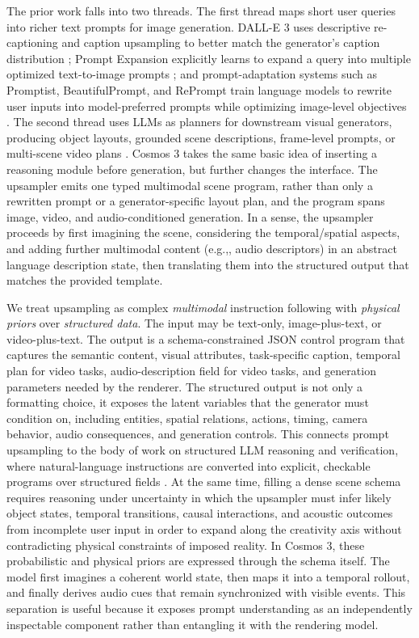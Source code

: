 \documentclass{llmxive}
\providecommand{\eg}{e.g.,\xspace}
\begin{document}
The prior work falls into two threads. The first thread maps short user queries into richer text prompts for image generation. DALL-E 3 uses descriptive re-captioning and caption upsampling to better match the generator's caption distribution \citep{betker2023improving}; Prompt Expansion explicitly learns to expand a query into multiple optimized text-to-image prompts \citep{datta-etal-2024-prompt}; and prompt-adaptation systems such as Promptist, BeautifulPrompt, and RePrompt train language models to rewrite user inputs into model-preferred prompts while optimizing image-level objectives \citep{hao2023optimizing,cao-etal-2023-beautifulprompt,wu2025reprompt}. The second thread uses LLMs as planners for downstream visual generators, producing object layouts, grounded scene descriptions, frame-level prompts, or multi-scene video plans \citep{lian2024llmgrounded,feng2023layoutgpt,hong2023direct2v,
lin2023videodirectorgpt}. Cosmos 3 takes the same basic idea of inserting a reasoning module before generation, but further changes the interface. The upsampler emits one typed multimodal scene program, rather than only a rewritten prompt or a generator-specific layout plan, and the program spans image, video, and audio-conditioned generation. In a sense, the upsampler proceeds by first imagining the scene, considering the temporal/spatial aspects, and adding further multimodal content (\eg, audio descriptors) in an abstract language description state, then translating them into the structured output that matches the provided template.

We treat upsampling as complex \emph{multimodal} instruction following with \emph{physical priors} over \emph{structured data}. The input may be text-only, image-plus-text, or video-plus-text. The output is a schema-constrained JSON control program that captures the semantic content, visual attributes, task-specific caption, temporal plan for video tasks, audio-description field for video tasks, and generation parameters needed by the renderer. The structured output is not only a formatting choice, it exposes the latent variables that the generator must condition on, including entities, spatial relations, actions, timing, camera behavior, audio consequences, and generation controls. This connects prompt upsampling to the body of work on structured LLM reasoning and verification, where natural-language instructions are converted into explicit, checkable programs over structured fields \citep{chegini-etal-2025-repanda}. At the same time, filling a dense scene schema requires reasoning under uncertainty in which the upsampler must infer likely object states, temporal transitions, causal interactions, and acoustic outcomes from incomplete user input \citep{pournemat2025reasoning} in order to expand along the creativity axis without contradicting physical constraints of imposed reality. In Cosmos 3, these probabilistic and physical priors are expressed through the schema itself. The model first imagines a coherent world state, then maps it into a temporal rollout, and finally derives audio cues that remain synchronized with visible events. This separation is useful because it exposes prompt understanding as an independently inspectable component rather than entangling it with the rendering model.
\end{document}
